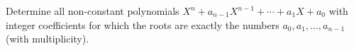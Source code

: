 Determine all non-constant polynomials $X^n+a_{n-1}X^{n-1}+\cdots +a_1X+a_0$ with integer coefficients for which the roots are exactly the numbers $a_0,a_1,\ldots ,a_{n-1}$ (with multiplicity).